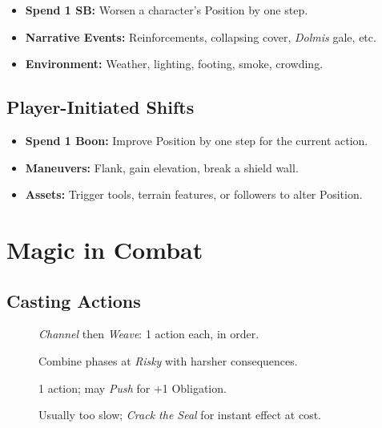 \begin{itemize}
  \item \textbf{Spend 1 SB:} Worsen a character’s Position by one step. 
  \item \textbf{Narrative Events:} Reinforcements, collapsing cover, \emph{Dolmis} gale, etc.
  \item \textbf{Environment:} Weather, lighting, footing, smoke, crowding.
\end{itemize}

\subsection{Player-Initiated Shifts}
\label{subsec:player-shifts}

\begin{itemize}
  \item \textbf{Spend 1 Boon:} Improve Position by one step for the current action. 
  \item \textbf{Maneuvers:} Flank, gain elevation, break a shield wall.
  \item \textbf{Assets:} Trigger tools, terrain features, or followers to alter Position.
\end{itemize}

\section{Magic in Combat}
\label{sec:magic-combat}

\subsection{Casting Actions}
\label{subsec:casting-actions}

\begin{description}
  \item[] \textit{Channel} then \textit{Weave}: 1 action each, in order. 
  \item[] Combine phases at \textit{Risky} with harsher consequences. 
  \item[] 1 action; may \textit{Push} for +1 Obligation. 
  \item[] Usually too slow; \textit{Crack the Seal} for instant effect at cost. 
\end{description}

